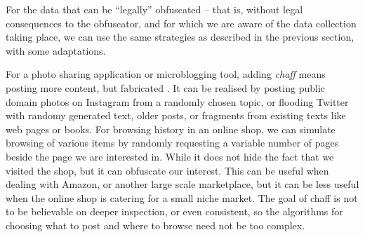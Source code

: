 \documentclass{IOS-Book-Article}     %
\newcommand{\tbox}[3][red]{{
\color{#1}\noindent{
   \fbox{\scriptsize{ {\bf #2} \textsl{#3}}}
   \vspace{2pt}
}
}}
\newcommand{\todo}[1]{\tbox{TODO:}{#1}}
\begin{document}
For the data that can be ``legally'' obfuscated -- that is, without legal 
consequences to the obfuscator, and for which we are aware of the data 
collection taking place, we can use the same strategies as described in the 
previous section, with some adaptations. 

For a photo sharing application or microblogging tool, adding \emph{chaff} 
means posting more content, but fabricated \todo{the q is do we want to?}. It 
can be realised by posting public domain photos on Instagram from a randomly 
chosen topic, or flooding Twitter with randomy generated text, older posts, or 
fragments from existing texts like web pages or books. For browsing history in 
an online shop, we can simulate browsing of various items by randomly requesting 
a variable number of pages beside the page we are interested in. While it does 
not hide the fact that we visited the shop, but it can obfuscate our interest. 
This can be useful when dealing with Amazon, or another large scale marketplace, 
but it can be less useful when the online shop is catering for a small niche 
market. 
The goal of chaff is not to be believable on deeper inspection, or even 
consistent, so the algorithms for choosing what to post and where to browse 
need not be too complex. 
\end{document}
